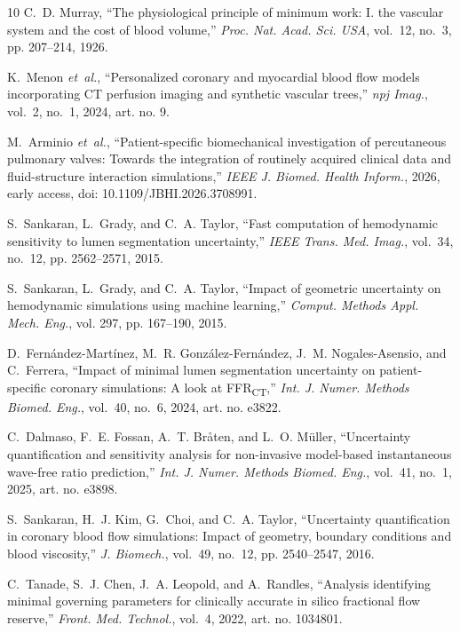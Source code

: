 \documentclass[journal,twoside,web]{ieeecolor}
\begin{document}
\begin{thebibliography}{10}
C.~D. Murray, ``The physiological principle of minimum work: I. the vascular
  system and the cost of blood volume,'' \emph{Proc. Nat. Acad. Sci. USA},
  vol.~12, no.~3, pp. 207--214, 1926.

K.~Menon \emph{et~al.}, ``Personalized coronary and myocardial blood flow
  models incorporating {CT} perfusion imaging and synthetic vascular trees,''
  \emph{npj Imag.}, vol.~2, no.~1, 2024, art. no. 9.

M.~Arminio \emph{et~al.}, ``Patient-specific biomechanical investigation of
  percutaneous pulmonary valves: {T}owards the integration of routinely
  acquired clinical data and fluid-structure interaction simulations,''
  \emph{IEEE J. Biomed. Health Inform.}, 2026, early access, doi:
  10.1109/JBHI.2026.3708991.

S.~Sankaran, L.~Grady, and C.~A. Taylor, ``Fast computation of hemodynamic
  sensitivity to lumen segmentation uncertainty,'' \emph{IEEE Trans. Med.
  Imag.}, vol.~34, no.~12, pp. 2562--2571, 2015.

S.~Sankaran, L.~Grady, and C.~A. Taylor, ``Impact of geometric uncertainty on
  hemodynamic simulations using machine learning,'' \emph{Comput. Methods Appl.
  Mech. Eng.}, vol. 297, pp. 167--190, 2015.

D.~Fern{\'a}ndez-Mart{\'i}nez, M.~R. Gonz{\'a}lez-Fern{\'a}ndez, J.~M.
  Nogales-Asensio, and C.~Ferrera, ``Impact of minimal lumen segmentation
  uncertainty on patient-specific coronary simulations: {A} look at
  {FFR\textsubscript{CT}},'' \emph{Int. J. Numer. Methods Biomed. Eng.},
  vol.~40, no.~6, 2024, art. no. e3822.

C.~Dalmaso, F.~E. Fossan, A.~T. Bråten, and L.~O. Müller, ``Uncertainty
  quantification and sensitivity analysis for non-invasive model-based
  instantaneous wave-free ratio prediction,'' \emph{Int. J. Numer. Methods
  Biomed. Eng.}, vol.~41, no.~1, 2025, art. no. e3898.

S.~Sankaran, H.~J. Kim, G.~Choi, and C.~A. Taylor, ``Uncertainty quantification
  in coronary blood flow simulations: Impact of geometry, boundary conditions
  and blood viscosity,'' \emph{J. Biomech.}, vol.~49, no.~12, pp. 2540--2547,
  2016.

C.~Tanade, S.~J. Chen, J.~A. Leopold, and A.~Randles, ``Analysis identifying
  minimal governing parameters for clinically accurate in silico fractional
  flow reserve,'' \emph{Front. Med. Technol.}, vol.~4, 2022, art. no. 1034801.


\end{thebibliography}
\end{document}
